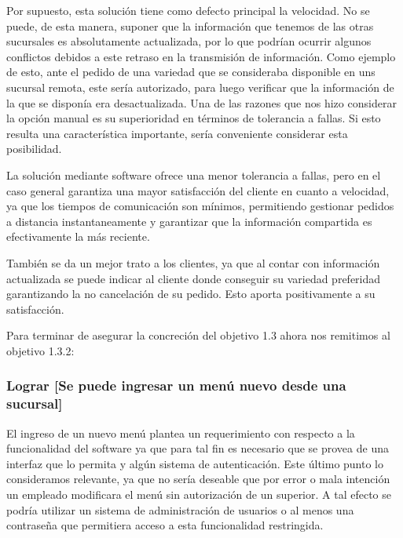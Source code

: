 \documentclass[a4paper,10pt]{article}
\begin{document}
Por supuesto, esta solución tiene como defecto principal la velocidad. No se puede, de esta manera, suponer que la información que tenemos de las otras sucursales es absolutamente actualizada, por lo que podrían ocurrir algunos conflictos debidos a este retraso en la transmisión de información. Como ejemplo de esto, ante el pedido de una variedad que se consideraba disponible en uns sucursal remota, este sería autorizado, para luego verificar que la información de la que se disponía era desactualizada. 
Una de las razones que nos hizo considerar la opción manual es su superioridad en términos de tolerancia a fallas. Si esto resulta una característica importante, sería conveniente considerar esta posibilidad.

La solución mediante software ofrece una menor tolerancia a fallas, pero en el caso general garantiza una mayor satisfacción del cliente en cuanto a velocidad, ya que los tiempos de comunicación son mínimos, permitiendo gestionar pedidos a distancia instantaneamente y garantizar que la información compartida es efectivamente la más reciente.

También se da un mejor trato a los clientes, ya que al contar con información actualizada se puede indicar al cliente donde conseguir su variedad preferidad garantizando la no cancelación de su pedido. Esto aporta positivamente a su satisfacción.



Para terminar de asegurar la concreción del objetivo 1.3 ahora nos remitimos al objetivo 1.3.2:
\subsubsection*{Lograr [Se puede ingresar un menú nuevo desde una sucursal]}
El ingreso de un nuevo menú plantea un requerimiento con respecto a la funcionalidad del software ya que para tal fin es necesario que se provea de una interfaz que lo permita y algún sistema de autenticación. Este último punto lo consideramos relevante, ya que no sería deseable que por error o mala intención un empleado modificara el menú sin autorización de un superior. A tal efecto se podría utilizar un sistema de administración de usuarios o al menos una contraseña que permitiera acceso a esta funcionalidad restringida.
\end{document}
